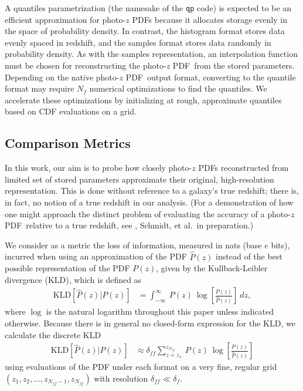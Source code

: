 \documentclass[\docopts]{\docclass}
\newcommand{\pz}{photo-$z$ PDF}
\begin{document}
A quantiles parametrization (the namesake of the \texttt{qp} code) is expected 
to be an efficient approximation for \pz s because it allocates storage evenly 
in the space of probability density.
In contrast, the histogram format stores data evenly spaced in redshift, and 
the samples format stores data randomly in probability density.
As with the samples representation, an interpolation function must be chosen 
for reconstructing the \pz\ from the stored parameters.
Depending on the native \pz\ output format, converting to the quantile format 
may require $N_{f}$ numerical optimizations to find the quantiles.
We accelerate these optimizations by initializing at rough, approximate 
quantiles based on CDF evaluations on a grid.





\subsection{Comparison Metrics}
\label{sec:metric}

In this work, our aim is to probe how closely \pz s reconstructed from limited 
set of stored parameters approximate their original, high-resolution 
representation.
This is done without reference to a galaxy's true redshift; there is, in fact, 
no notion of a true redshift in our analysis.
(For a demonstration of how one might approach the distinct problem of 
evaluating the accuracy of a \pz\ relative to a true redshift, see 
\citet{polsterer_uncertain_2016}, Schmidt, et al.\ in preparation.)

We consider as a metric the loss of information, measured in nats (base $e$ 
bits), incurred when using an approximation of the PDF $\hat{P}(z)$ instead of 
the best possible representation of the  PDF $P(z)$, given by the 
Kullback-Leibler divergence (KLD), which is defined as
\begin{align}
  \label{eq:kld}
  \mathrm{KLD}[\hat{P}(z) | P(z)] &= \int_{-\infty}^{\infty}\ P(z)\ 
\log\left[\frac{P(z)}{\hat{P}(z)}\right]\ dz,
\end{align}
where $\log$ is the natural logarithm throughout this paper unless indicated 
otherwise.
Because there is in general no closed-form expression for the KLD, we calculate 
the discrete KLD
\begin{align}
  \label{eq:kld_approx}
  \mathrm{KLD}[\hat{P}(z) | P(z)] &\approx 
\delta_{ff}\sum_{z=z_{1}}^{z_{N_{ff}}}\ P(z)\ 
\log\left[\frac{P(z)}{\hat{P}(z)}\right]
\end{align}
using evaluations of the PDF under each format on a very fine, regular grid 
$(z_{1}, z_{2}, \dots, z_{N_{ff}-1}, z_{N_{ff}})$ with resolution 
$\delta_{ff}\ll\delta_{f}$.
\end{document}
